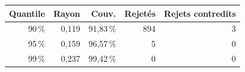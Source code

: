 \begin{tabular}{@{}rrrrr@{}}
\toprule
Quantile & Rayon & Couv. & Rejetés & Rejets contredits\\
\midrule
90\,\% & 0,119 & 91,83\,\% & 894 & 3\\
95\,\% & 0,159 & 96,57\,\% & 5 & 0\\
99\,\% & 0,237 & 99,42\,\% & 0 & 0\\
\bottomrule
\end{tabular}
